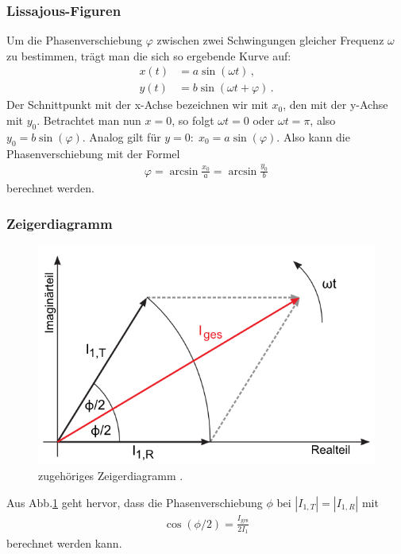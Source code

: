 \documentclass[12pt,a4paper,titlepage,headinclude,bibtotoc]{scrartcl}
\begin{document}
\subsubsection{Lissajous-Figuren}
Um die Phasenverschiebung $\varphi$ zwischen zwei Schwingungen gleicher Frequenz $\omega$ zu bestimmen, trägt man die sich so ergebende Kurve auf:
\begin{align*}
	x(t)&=a\sin(\omega t)\,,\\
	y(t)&=b\sin(\omega t + \varphi) \,.
\end{align*}
Der Schnittpunkt mit der x-Achse bezeichnen wir mit $x_0$, den mit der y-Achse mit $y_0$.
Betrachtet man nun $x=0$, so folgt $\omega t=0$ oder $\omega t=\pi$, also $y_0=b \sin(\varphi)$.
Analog gilt für $y=0:\;x_0=a\sin(\varphi)$.
Also kann die Phasenverschiebung mit der Formel
\begin{align}
	\varphi=\arcsin\frac{x_0}{a}=\arcsin\frac{y_0}{b}
	\label{eq:lissajous}
\end{align}
berechnet werden.
\subsubsection{Zeigerdiagramm}
\begin{figure}[!htb]
	\centering
	\includegraphics[scale=0.8]{Zeigerdiagramm.png}
	\caption{zugehöriges Zeigerdiagramm \cite[Datum: 01.09.2014]{LP16}.}
	\label{fig:zeigerdiagramm}
\end{figure}
Aus Abb.\ref{fig:zeigerdiagramm} geht hervor, dass die Phasenverschiebung $\phi$ bei $|I_{1,T}|=|I_{1,R}|$ mit
\begin{align}
	\cos(\phi/2)=\frac{I_\text{ges}}{2I_1}
	\label{eq:zeigerdiagramm}
\end{align}
berechnet werden kann.
\end{document}
